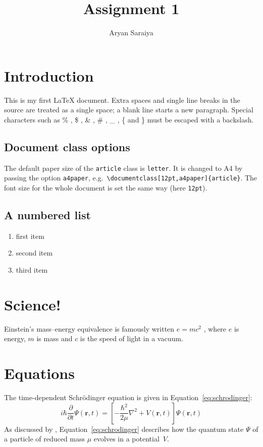 \documentclass[12pt,a4paper]{article}
\title{Assignment 1}
\author{Aryan Saraiya}
\date{}
\begin{document}
\maketitle
\tableofcontents
 
\section{Introduction}
This is my first \LaTeX{} document. Extra spaces and single line breaks in the source
are treated as a single space; a blank line starts a new paragraph. Special characters
such as \% , \$ , \& , \# , \_ , \{ and \} must be escaped with a backslash.
 
\subsection{Document class options}
The default paper size of the \texttt{article} class is \texttt{letter}. It is changed
to A4 by passing the option \texttt{a4paper}, e.g.\ \verb|\documentclass[12pt,a4paper]{article}|.
The font size for the whole document is set the same way (here \texttt{12pt}).
 
\subsection{A numbered list}
\begin{enumerate}
  \item first item
  \item second item
  \item third item
\end{enumerate}
 
\section{Science!}
Einstein's mass--energy equivalence is famously written $e = mc^2$ \citep{einstein1905},
where $e$ is energy, $m$ is mass and $c$ is the speed of light in a vacuum.
 
\section{Equations}
The time-dependent Schr\"odinger equation \citep{schrodinger1926} is given in
Equation~\eqref{eq:schrodinger}:
\begin{equation}
  i\hbar \frac{\partial}{\partial t}\Psi(\mathbf{r},t) =
  \left[ -\frac{\hbar^{2}}{2\mu}\nabla^{2} + V(\mathbf{r},t) \right]\Psi(\mathbf{r},t)
  \label{eq:schrodinger}
\end{equation}
As discussed by \citet{schrodinger1926}, Equation~\eqref{eq:schrodinger} describes how
the quantum state $\Psi$ of a particle of reduced mass $\mu$ evolves in a potential~$V$.
 


\end{document}
